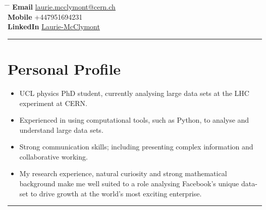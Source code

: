 \documentclass[10pt]{article} %
\begin{document}


\parbox{0.5\textwidth}{ %
\title{} %
}
\hspace{2cm} %
\parbox{0.5\textwidth}{ %
  \begin{tabbing} %
    \hspace{2cm} \= \hspace{3cm} \= \kill %
           {\bf Email} \> \href{mailto:laurie.mcclymont@cern.ch}{laurie.mcclymont@cern.ch} \\ %
           {\bf Mobile} \> +447951694231  \\ %
           {\bf LinkedIn} \> \href{https://www.linkedin.com/in/laurie-mcclymont-695520118/}{Laurie-McClymont} %
  \end{tabbing}
}

\rule{\textwidth}{0.5mm}


\vspace{-2mm}
\section{Personal Profile}
\begin{itemize}
\item{UCL physics PhD student, currently analysing large data sets at the LHC experiment at CERN.}
\item{Experienced in using computational tools, such as Python, to analyse and understand large data sets.}
\item{Strong communication skills; including presenting complex information and collaborative working.}
\item{My research experience, natural curiosity and strong mathematical background make me well suited to a role
  analysing Facebook's unique data-set to drive growth at the world's most exciting enterprise.}
\end{itemize}


\vspace{0.2mm}
\rule{\textwidth}{0.5mm}
\end{document}
